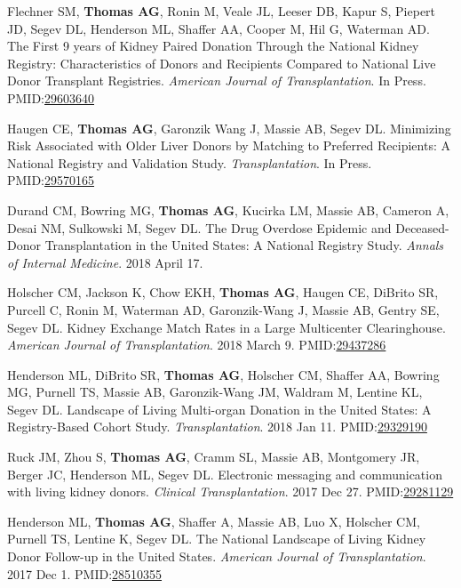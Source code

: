 \documentclass[10pt]{article}
\makeatletter
\newlength{\bibhang}
\newlength{\bibsep}
 {\@listi \global\bibsep\itemsep \global\advance\bibsep by\parsep}
\newenvironment{bibenum*}
  {\renewcommand\labelenumi{[\theenumi]}%
   \etaremune[
     topsep=0pt,
     itemsep=\bibsep,
     parsep=0pt,partopsep=0pt,
     itemindent=-\bibhang,
     leftmargin={\bibhang+\widthof{[999]}}]}
  {\endetaremune}
\newcommand{\pmid}[1]{PMID:\href{https://www.ncbi.nlm.nih.gov/pubmed/#1}{#1}}
\makeatother
\begin{document}
\begin{bibenum*}
\item Flechner SM, \textbf{Thomas AG}, Ronin M,
  Veale JL, Leeser DB, Kapur S, Piepert JD, Segev DL, Henderson ML,
  Shaffer AA, Cooper M, Hil G, Waterman AD.
  The First 9 years of Kidney Paired Donation Through the National Kidney
  Registry: Characteristics of Donors and Recipients Compared to National Live
  Donor Transplant Registries.
  \emph{American Journal of Transplantation}. In Press.
  \pmid{29603640} 

\item Haugen CE, \textbf{Thomas AG}, Garonzik Wang J, Massie AB,
  Segev DL. Minimizing Risk Associated with Older Liver Donors by
  Matching to Preferred Recipients: A National Registry and
  Validation Study.
  \emph{Transplantation}. In Press.
  \\\pmid{29570165} 

\item Durand CM\dag, Bowring MG\dag, \textbf{Thomas AG}, Kucirka LM,
  Massie AB, Cameron A, Desai NM, Sulkowski M, Segev DL.
  The Drug Overdose Epidemic and Deceased-Donor Transplantation
  in the United States: A National Registry Study.
  \emph{Annals of Internal Medicine}. 2018 April 17.

\item Holscher CM, Jackson K, Chow EKH, \textbf{Thomas AG}, Haugen CE,
  DiBrito SR, Purcell C, Ronin M, Waterman AD, Garonzik-Wang J, Massie AB,
  Gentry SE, Segev DL. Kidney Exchange Match Rates in a Large
  Multicenter Clearinghouse.
  \emph{American Journal of Transplantation}. 2018 March 9.
  \pmid{29437286} 

\item Henderson ML\dag, DiBrito SR\dag, \textbf{Thomas AG}, Holscher CM,
  Shaffer AA, Bowring MG, Purnell TS, Massie AB, Garonzik-Wang JM,
  Waldram M, Lentine KL, Segev DL.  Landscape of Living Multi-organ
  Donation in the United States: A Registry-Based Cohort Study.
  \emph{Transplantation}. 2018 Jan 11.
  \pmid{29329190} 

\item Ruck JM, Zhou S, \textbf{Thomas AG}, Cramm SL, Massie AB,
  Montgomery JR, Berger JC, Henderson ML, Segev DL.
  Electronic messaging and communication with living kidney donors.
  \emph{Clinical Transplantation}. 2017 Dec 27.
  \pmid{29281129} 

\item Henderson ML\dag, \textbf{Thomas AG\dag}, Shaffer A, Massie AB, Luo X,
  Holscher CM, Purnell TS, Lentine K, Segev DL. The National Landscape
  of Living Kidney Donor Follow-up in the United States.
  \emph{American Journal of Transplantation}. 2017 Dec 1.
  \pmid{28510355} 


\end{bibenum*}
\end{document}

